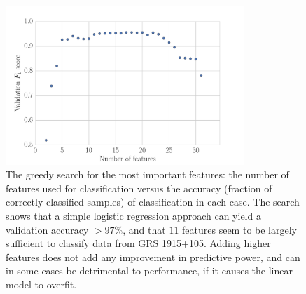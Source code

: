 \documentclass[12pt]{emulateapj}
\begin{document}
\begin{figure}[htbp]
\begin{center}
\includegraphics[width=9cm]{grs1915_feature_accuracy}
\caption{The greedy search for the most important features: the number of features used for classification versus the accuracy (fraction of correctly classified samples) of classification in each case. The search shows that a simple logistic regression approach can yield a validation accuracy $>97\%$, and that $11$ features seem to be largely sufficient to classify data from GRS 1915+105. Adding higher features does not add any improvement in predictive power, and can in some cases be detrimental to performance, if it causes the linear model to overfit.}
\label{fig:scores}
\end{center}
\end{figure}
\end{document}
